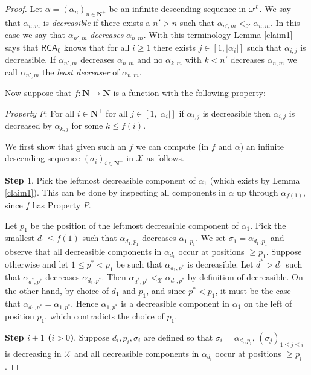 \documentclass[a4paper,11pt]{article}
\newcommand\Nat{\mathbf{N}}
\newcommand\RCA{\mathsf{RCA}}
\newcommand\ordX{\mathcal{X}}
\begin{document}
\begin{proof}
Let $\alpha= (\alpha_n)_{n\in \Nat^+}$ be an infinite descending sequence in $\omega^\ordX$. 
We say that $\alpha_{n,m}$ is \emph{decreasible} if there exists a $n'>n$ such that $\alpha_{n',m} <_\ordX \alpha_{n,m}$. In this case we say that $\alpha_{n',m}$ \emph{decreases} $\alpha_{n,m}$. 
With this terminology Lemma \ref{claim1} says that $\RCA_0$ knows that for all $i\geq 1$ there exists $j \in [1, |\alpha_i|]$ such that $\alpha_{i,j}$ is decreasible. If $\alpha_{n',m}$ decreases $\alpha_{n,m}$ and no $\alpha_{k,m}$ 
with $k < n'$ decreases $\alpha_{n,m}$ we call $\alpha_{n',m}$ the \emph{least decreaser} of $\alpha_{n,m}$. 

Now suppose that $f:\Nat \to \Nat$ is a function with the following property:

\bigskip
{\em Property P}: For all $i\in \Nat^+$ for all $j \in [1, |\alpha_i|]$
if $\alpha_{i,j}$ is decreasible then $\alpha_{i,j}$ is decreased by $\alpha_{k,j}$ for some $k\leq f(i)$. 

\bigskip
We first show that given such an $f$ we can compute (in $f$ and $\alpha$) 
an infinite descending sequence $(\sigma_i)_{i\in\Nat^+}$ in $\mathcal{X}$ as follows. 

\bigskip
{\bf Step $1$}.  
Pick the leftmost decreasible component of $\alpha_1$ (which exists by Lemma \ref{claim1}). 
This can be done by inspecting all components 
in $\alpha$ up through $\alpha_{f(1)}$, since $f$ has Property $P$. 

Let $p_1$ be the position of the leftmost decreasible component of $\alpha_1$. 
Pick the smallest $d_1 \leq f(1)$ such that $\alpha_{d_1, p_1}$ decreases 
$\alpha_{1,p_1}$. 
We set $\sigma_1 = \alpha_{d_1, p_1}$ and observe that
all decreasible components in $\alpha_{d_1}$ occur at positions $\geq p_1$. 
Suppose otherwise and let $1\leq p^* < p_1$ be such that $\alpha_{d_1, p^*}$ is decreasible. 
Let $d^* > d_1$ such that $\alpha_{d^*, p^*}$ decreases $\alpha_{d_1,p^*}$. Then 
$\alpha_{d^*, p^*} <_{\ordX} \alpha_{d_1,p^*}$ by definition of decreasible. 
On the other hand, by choice of $d_1$ and $p_1$, and since
$p^* < p_1$, it must be the case that $\alpha_{d_1, p^*} = \alpha_{1, p^*}$. Hence $\alpha_{1, p^*}$ is a decreasible
component in $\alpha_1$ on the left of position $p_1$, which contradicts the choice of $p_1$. 

\bigskip
{\bf Step $i+1$ ($i > 0$)}. Suppose $d_i, p_i, \sigma_i$ are defined so that $\sigma_i = \alpha_{d_i, p_i}$, $(\sigma_j)_{1\leq j\leq i}$ is decreasing in $\mathcal{X}$ and all decreasible components in $\alpha_{d_i}$ occur at positions $\geq p_i$. 


\end{proof}
\end{document}
